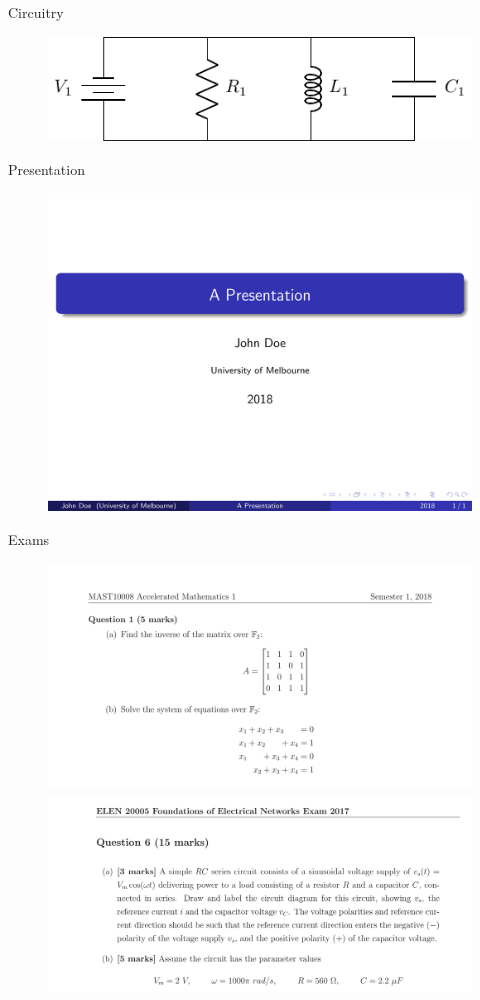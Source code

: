\begin{frame}{\insertsection}{Circuitry}
	\begin{figure}
		\includegraphics[width=0.7\linewidth]{./LaTex_Tikz/circuitikz.pdf}
	\end{figure}
\end{frame}

\begin{frame}{\insertsection}{Presentation}
	\begin{figure}
		\includegraphics[width=0.4\linewidth]{./Images/beamer.png}
	\end{figure}
\end{frame}

\begin{frame}{\insertsection}{Exams}
	\begin{figure}
		\includegraphics[width=0.4\linewidth]{./Images/AM1-2.png}
		\hspace{5em}
		\includegraphics[width=0.4\linewidth]{./Images/elen.png}
	\end{figure}
\end{frame}

